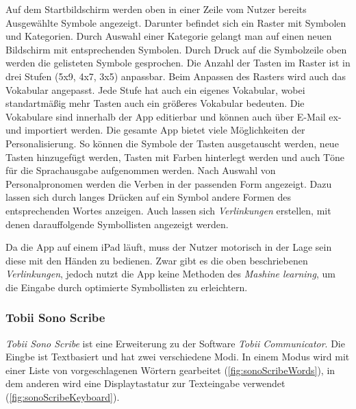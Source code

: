             Auf dem Startbildschirm werden oben in einer Zeile vom Nutzer bereits Ausgewählte Symbole angezeigt. Darunter befindet sich ein Raster mit Symbolen und Kategorien. Durch Auswahl einer Kategorie gelangt man auf einen neuen Bildschirm mit entsprechenden Symbolen.
            Durch Druck auf die Symbolzeile oben werden die gelisteten Symbole gesprochen. 
            Die Anzahl der Tasten im Raster ist in drei Stufen (5x9, 4x7, 3x5) anpassbar. Beim Anpassen des Rasters wird auch das Vokabular angepasst. Jede Stufe hat auch ein eigenes Vokabular, wobei standartmäßig mehr Tasten auch ein größeres Vokabular bedeuten. Die Vokabulare sind innerhalb der App editierbar und können auch über E-Mail ex- und importiert werden. Die gesamte App bietet viele Möglichkeiten der Personalisierung. So können die Symbole der Tasten ausgetauscht werden, neue Tasten hinzugefügt werden, Tasten mit Farben hinterlegt werden und auch Töne für die Sprachausgabe aufgenommen werden. Nach Auswahl von Personalpronomen werden die Verben in der passenden Form angezeigt. Dazu lassen sich durch langes Drücken auf ein Symbol andere Formen des entsprechenden Wortes anzeigen. Auch lassen sich \emph{Verlinkungen} erstellen, mit denen darauffolgende Symbollisten angezeigt werden.
            
            Da die App auf einem iPad läuft, muss der Nutzer motorisch in der Lage sein diese mit den Händen zu bedienen. Zwar gibt es die oben beschriebenen \emph{Verlinkungen}, jedoch nutzt die App keine Methoden des \emph{Mashine learning}, um die Eingabe durch optimierte Symbollisten zu erleichtern.
            
        \subsubsection*{Tobii Sono Scribe}
        
        	\emph{Tobii Sono Scribe} ist eine Erweiterung zu der Software \emph{Tobii Communicator}. Die Eingbe ist Textbasiert und hat zwei verschiedene Modi. In einem Modus wird mit einer Liste von vorgeschlagenen Wörtern gearbeitet (\autoref{fig:sonoScribeWords}), in dem anderen wird eine Displaytastatur zur Texteingabe verwendet (\autoref{fig:sonoScribeKeyboard}).
            
